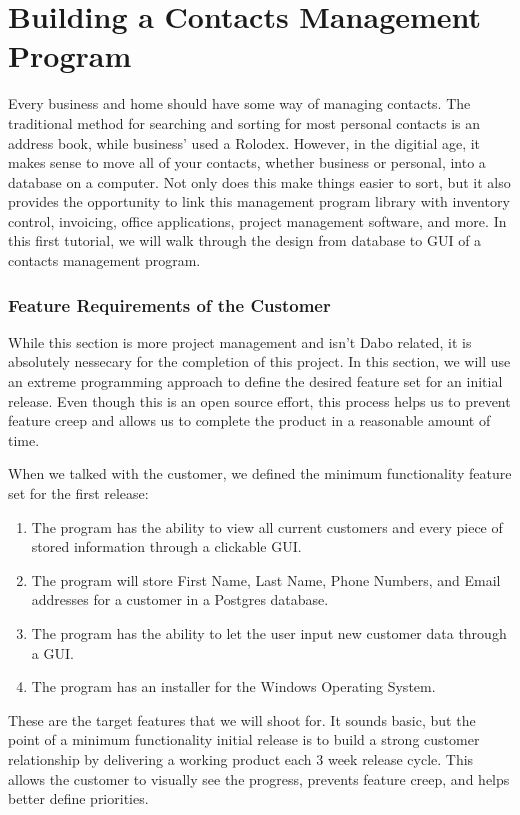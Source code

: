 
\chapter{Building a Contacts Management Program}

Every business and home should have some way of managing contacts.  The traditional method for searching and sorting for most personal contacts is an address book, while business' used a Rolodex.  However, in the digitial age, it makes sense to move all of your contacts, whether business or personal, into a database on a computer.  Not only does this make things easier to sort, but it also provides the opportunity to link this management program library with inventory control, invoicing, office applications, project management software, and more.  In this first tutorial, we will walk through the design from database to GUI of a contacts management program.

\subsection{Feature Requirements of the Customer}

While this section is more project management and isn't Dabo related, it is absolutely nessecary for the completion of this project.  In this section, we will use an extreme programming approach to define the desired feature set for an initial release.  Even though this is an open source effort, this process helps us to prevent feature creep and allows us to complete the product in a reasonable amount of time.

When we talked with the customer, we defined the minimum functionality feature set for the first release:
\begin{enumerate}
	\item The program has the ability to view all current customers and every piece of stored information through a clickable GUI.
	\item The program will store First Name, Last Name, Phone Numbers, and Email addresses for a customer in a Postgres database.
	\item The program has the ability to let the user input new customer data through a GUI.
	\item The program has an installer for the Windows Operating System.
\end{enumerate}

These are the target features that we will shoot for.  It sounds basic, but the point of a minimum functionality initial release is to build a strong customer relationship by delivering a working product each 3 week release cycle.  This allows the customer to visually see the progress, prevents feature creep, and helps better define priorities.

